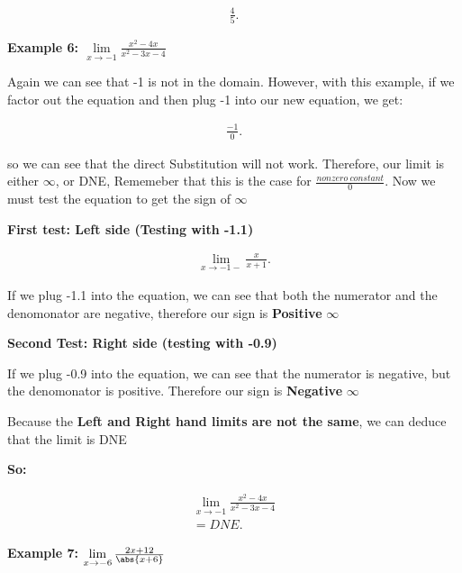 \documentclass{report}
\begin{document}
    \begin{align*}
        \frac{4}{5}
    .\end{align*}

    \bigbreak \noindent \bigbreak \noindent 
   \begin{large}
      \textbf{Example 6: $\lim\limits_{x \to -1}{ \frac{x^2-4x}{x^2-3x-4}}$} 
   \end{large}

   \bigbreak \noindent 
   Again we can see that -1 is not in the domain. However, with this example, if we factor
   out the equation and then plug -1 into our new equation, we get:

   \begin{align*}
       \frac{-1}{0}
   .\end{align*}
    
   \bigbreak \noindent 
   so we can see that the direct Substitution will not work. Therefore, our limit is either 
   $\infty$, or DNE, Rememeber that this is the case for $\frac{nonzero\ constant}{0}$. 
   Now we must test the equation to get the sign of $\infty$

   \bigbreak \noindent 
   \textbf{First test: Left side (Testing with -1.1)}

   \begin{align*}
       \lim\limits_{x \to -1-}{ \frac{x}{x+1}}
   .\end{align*}

   \bigbreak \noindent 
   If we plug -1.1 into the equation, we can see that both the numerator and the denomonator are negative, 
   therefore our sign is \textbf{Positive} $\infty$

   \bigbreak \noindent 
   \textbf{Second Test: Right side (testing with -0.9)}
   
   \bigbreak \noindent 
   If we plug -0.9 into the equation, we can see that the numerator is negative, but the denomonator
   is positive. Therefore our sign is \textbf{Negative} $\infty$

   \bigbreak \noindent 
   Because the \textbf{Left and Right hand limits are not the same}, we can deduce that the limit is DNE

   \bigbreak \noindent 
   \textbf{So:}

   \begin{align*}
       \lim\limits_{x \to -1}{ \frac{x^2-4x}{x^2-3x-4}} \\
       = DNE
   .\end{align*}
   
   \bigbreak \noindent \bigbreak \noindent 
   \begin{large}
       \noindent \textbf{Example 7: $\lim\limits_{x \to -6}{ \frac{2x+12}{\abs{x+6}}}$} 
   \end{large}
\end{document}

